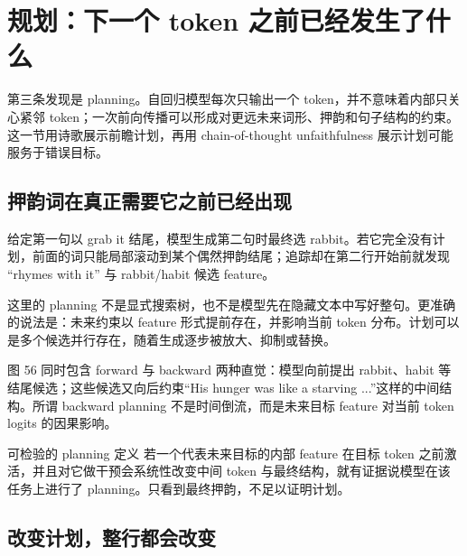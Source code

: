 \section{规划：下一个 token 之前已经发生了什么}

第三条发现是 planning。自回归模型每次只输出一个 token，并不意味着内部只关心紧邻 token；一次前向传播可以形成对更远未来词形、押韵和句子结构的约束。这一节用诗歌展示前瞻计划，再用 chain-of-thought unfaithfulness 展示计划可能服务于错误目标。


\subsection{押韵词在真正需要它之前已经出现}

给定第一句以 grab it 结尾，模型生成第二句时最终选 rabbit。若它完全没有计划，前面的词只能局部滚动到某个偶然押韵结尾；追踪却在第二行开始前就发现 “rhymes with it” 与 rabbit/habit 候选 feature。



这里的 planning 不是显式搜索树，也不是模型先在隐藏文本中写好整句。更准确的说法是：未来约束以 feature 形式提前存在，并影响当前 token 分布。计划可以是多个候选并行存在，随着生成逐步被放大、抑制或替换。


图 56 同时包含 forward 与 backward 两种直觉：模型向前提出 rabbit、habit 等结尾候选；这些候选又向后约束“His hunger was like a starving ...”这样的中间结构。所谓 backward planning 不是时间倒流，而是未来目标 feature 对当前 token logits 的因果影响。

\begin{importantbox}{可检验的 planning 定义}
若一个代表未来目标的内部 feature 在目标 token 之前激活，并且对它做干预会系统性改变中间 token 与最终结构，就有证据说模型在该任务上进行了 planning。只看到最终押韵，不足以证明计划。
\end{importantbox}

\subsection{改变计划，整行都会改变}

